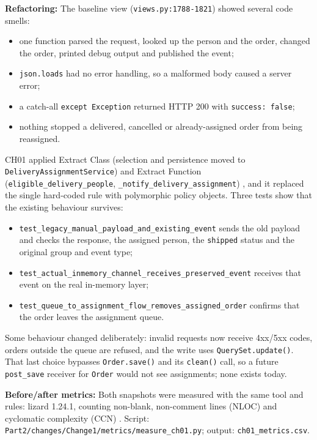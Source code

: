 \documentclass[11pt,a4paper]{article}
\newcommand{\entry}[1]{\par\textbf{#1:} }
\newcommand{\code}[1]{\nolinkurl{#1}}
\begin{document}
\entry{Refactoring}The baseline view (\code{views.py:1788-1821}) showed several code smells:
\begin{itemize}
\item one function parsed the request, looked up the person and the order, changed the order, printed debug output and published the event;
\item \code{json.loads} had no error handling, so a malformed body caused a server error;
\item a catch-all \code{except Exception} returned HTTP 200 with \code{success: false};
\item nothing stopped a delivered, cancelled or already-assigned order from being reassigned.
\end{itemize}
CH01 applied Extract Class (selection and persistence moved to \code{DeliveryAssignmentService}) and Extract Function (\code{eligible_delivery_people}, \code{_notify_delivery_assignment}) \cite{fowler}, and it replaced the single hard-coded rule with polymorphic policy objects. Three tests show that the existing behaviour survives:
\begin{itemize}
\item \code{test_legacy_manual_payload_and_existing_event} sends the old payload and checks the response, the assigned person, the \code{shipped} status and the original group and event type;
\item \code{test_actual_inmemory_channel_receives_preserved_event} receives that event on the real in-memory layer;
\item \code{test_queue_to_assignment_flow_removes_assigned_order} confirms that the order leaves the assignment queue.
\end{itemize}
Some behaviour changed deliberately: invalid requests now receive 4xx/5xx codes, orders outside the queue are refused, and the write uses \code{QuerySet.update()}. That last choice bypasses \code{Order.save()} and its \code{clean()} call, so a future \code{post_save} receiver for \code{Order} would not see assignments; none exists today.

\entry{Before/after metrics}Both snapshots were measured with the same tool and rules: lizard 1.24.1, counting non-blank, non-comment lines (NLOC) and cyclomatic complexity (CCN) \cite{lizard,mccabe}. Script: \code{Part2/changes/Change1/metrics/measure_ch01.py}; output: \code{ch01_metrics.csv}.
\end{document}
